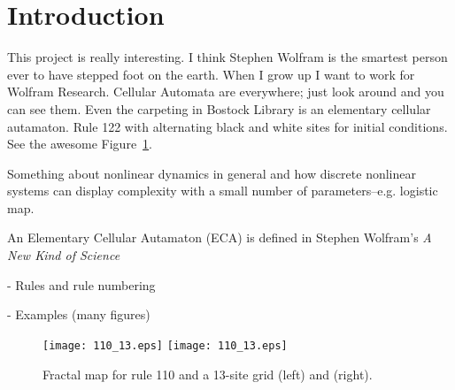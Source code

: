 \section{Introduction}

This project is really interesting.
I think Stephen Wolfram is the smartest person ever to have stepped
foot on the earth.
When I grow up I want to work for Wolfram Research.
Cellular Automata are everywhere; just look around and you can see
them.
Even the carpeting in Bostock Library is an elementary cellular
autamaton.
Rule 122 with alternating black and white sites for initial
conditions.
See the awesome Figure~\ref{110_map}.

Something about nonlinear dynamics in general and how discrete
nonlinear systems can display complexity with a small number of
parameters--e.g. logistic map.

An Elementary Cellular Autamaton (ECA) is defined in Stephen Wolfram's
\emph{A New Kind of Science}~\cite{anks}

- Rules and rule numbering

- Examples (many figures)

\begin{figure}
\centering
\texttt{[image: 110\_13.eps]}
\hspace{0.1\textwidth}
\texttt{[image: 110\_13.eps]}
\caption{\label{110_map} Fractal map for rule 110 and a 13-site grid
(left) and (right).}
\end{figure}
